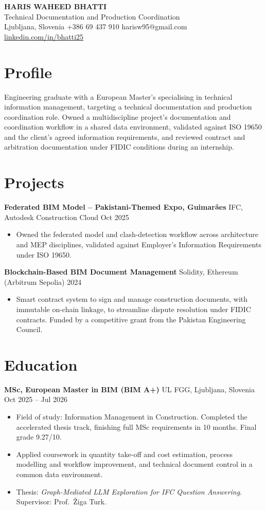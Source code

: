 \documentclass[a4paper,10.5pt]{article}
\newcommand{\datefill}{\dotfill}
\newcommand{\entry}[3]{\vspace{2.5pt}\noindent\textbf{#1} \textbar{} #2 \datefill{} #3\par\vspace{0.5pt}}
\newcommand{\ROLELINE}{Technical Documentation and Production Coordination}
\newcommand{\projGuimaraes}{%
\entry{Federated BIM Model -- Pakistani-Themed Expo, Guimar\~aes}{IFC, Autodesk Construction Cloud}{Oct 2025}
\begin{itemize}
  \item Owned the federated model and clash-detection workflow across architecture
        and MEP disciplines, validated against Employer's Information Requirements
        under ISO 19650.
\end{itemize}}
\newcommand{\projBlockchain}{%
\entry{Blockchain-Based BIM Document Management}{Solidity, Ethereum (Arbitrum Sepolia)}{2024}
\begin{itemize}
  \item Smart contract system to sign and manage construction documents, with
        immutable on-chain linkage, to streamline dispute resolution under FIDIC
        contracts. Funded by a competitive grant from the
        Pakistan Engineering Council.
\end{itemize}}
\begin{document}
\begin{center}
  {\LARGE\bfseries HARIS WAHEED BHATTI}\\[2pt]
  {\large \ROLELINE}\\[3pt]
  Ljubljana, Slovenia \textbar{} +386 69 437 910 \textbar{} harisw95@gmail.com\\
  \href{https://linkedin.com/in/bhatti25}{linkedin.com/in/bhatti25}
\end{center}
\vspace{-4pt}

\section{Profile}

\noindent Engineering graduate with a European Master's specialising in technical
information management, targeting a technical documentation and production
coordination role. Owned a multidiscipline project's documentation and coordination
workflow in a shared data environment, validated against ISO 19650 and the client's
agreed information requirements, and reviewed contract and arbitration documentation
under FIDIC conditions during an internship.

\section{Projects}

 \projGuimaraes \projBlockchain

\section{Education}
\entry{MSc, European Master in BIM (BIM A+)}{UL FGG, Ljubljana, Slovenia}{Oct 2025 -- Jul 2026}
\begin{itemize}
  \item Field of study: Information Management in Construction. Completed the
        accelerated thesis track, finishing full MSc requirements in 10 months.
        Final grade 9.27/10.
  \item Applied coursework in quantity take-off and cost estimation, process
        modelling and workflow improvement, and technical document control in a
        common data environment.
  \item Thesis: \textit{Graph-Mediated LLM Exploration for IFC Question Answering}.
        Supervisor: Prof.~\v{Z}iga Turk.
\end{itemize}
\end{document}
